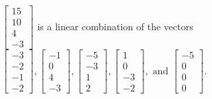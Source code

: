 \begin{exercise}
\begin{exerciseStatement}
  \end{exerciseStatement}
  \begin{exerciseAnswer}
   \(\left[\begin{array}{c}
15 \\
10 \\
4 \\
-3
\end{array}\right]\) 
  	 is  
	a linear combination of the vectors \(\left[\begin{array}{c}
-3 \\
-2 \\
-1 \\
-2
\end{array}\right] , \left[\begin{array}{c}
-1 \\
0 \\
4 \\
-3
\end{array}\right] , \left[\begin{array}{c}
-5 \\
-3 \\
1 \\
2
\end{array}\right] , \left[\begin{array}{c}
1 \\
0 \\
-3 \\
-2
\end{array}\right] , \text{ and } \left[\begin{array}{c}
-5 \\
0 \\
0 \\
0
\end{array}\right]\).

	
  


  \end{exerciseAnswer}
\end{exercise}